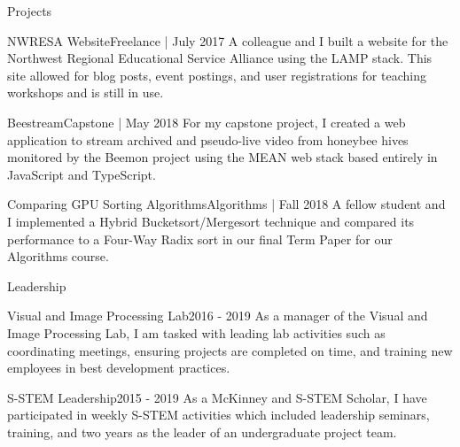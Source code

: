 \documentclass{resume} %
\begin{document}
\begin{rSection}{Projects}
\begin{rSubsection}{NWRESA Website}{Freelance | July 2017}{}{}{}
    A colleague and I built a website for the Northwest Regional Educational Service Alliance using the LAMP stack.  This site allowed for blog posts, event postings, and user registrations for teaching workshops and is still in use. 
\end{rSubsection}
\begin{rSubsection}{Beestream}{Capstone | May 2018}{}{}{}
    For my capstone project, I created a web application to stream archived and pseudo-live video from honeybee hives monitored by the Beemon project using the MEAN web stack based entirely in JavaScript and TypeScript.  
\end{rSubsection}
\begin{rSubsection}{Comparing GPU Sorting Algorithms}{Algorithms | Fall 2018}{}{}{}
    A fellow student and I implemented a Hybrid Bucketsort/Mergesort technique and compared its performance to a Four-Way Radix sort in our final Term Paper for our Algorithms course.   
\end{rSubsection}

\end{rSection}


\begin{rSection}{Leadership}
\begin{rSubsection}{Visual and Image Processing Lab}{2016 - 2019}{}{}{}
    As a manager of the Visual and Image Processing Lab, I am tasked with leading lab activities such as coordinating meetings, ensuring projects are completed on time, and training new employees in best development practices.  
\end{rSubsection}
\begin{rSubsection}{S-STEM Leadership}{2015 - 2019}{}{}{}
    As a McKinney and S-STEM Scholar, I have participated in weekly S-STEM activities which included leadership seminars, training, and two years as the leader of an undergraduate project team.  
\end{rSubsection}
\end{rSection}

\end{document}
